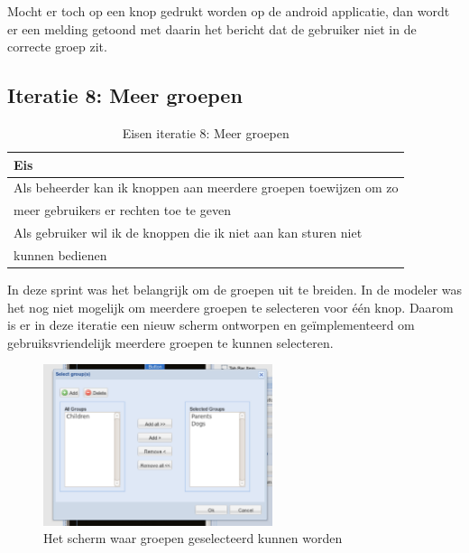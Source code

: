 \documentclass[]{article}
\begin{document}
Mocht er toch op een knop gedrukt worden op de android applicatie, dan wordt er een
melding getoond met daarin het bericht dat de gebruiker niet in de correcte
groep zit. 

\newpage
\subsection{Iteratie 8: Meer groepen}

\begin{table}[htpb]
  \caption{Eisen iteratie 8: Meer groepen}
  \begin{center}
    \begin{tabular}{|| l ||}\hline
        Eis                                                              \\\hline\hline
        Als beheerder kan ik knoppen aan meerdere groepen toewijzen om zo\\
        meer gebruikers er rechten toe te geven                          \\\hline
        Als gebruiker wil ik de knoppen die ik niet aan kan sturen niet  \\ 
        kunnen bedienen                                                  \\\hline
    \end{tabular}
  \end{center}
\end{table}

In deze sprint was het belangrijk om de groepen uit te breiden. In de modeler was
het nog niet mogelijk om meerdere groepen te selecteren voor \'e\'en knop.
Daarom is er in deze iteratie een nieuw scherm ontworpen en ge\"implementeerd
om gebruiksvriendelijk meerdere groepen te kunnen selecteren.

\begin{figure}[h!]
  \centering
    \includegraphics[width=0.6\textwidth,keepaspectratio]{groupselect.pdf}
  \caption{Het scherm waar groepen geselecteerd kunnen worden}
  \label{groupselect}
\end{figure}
\end{document}
